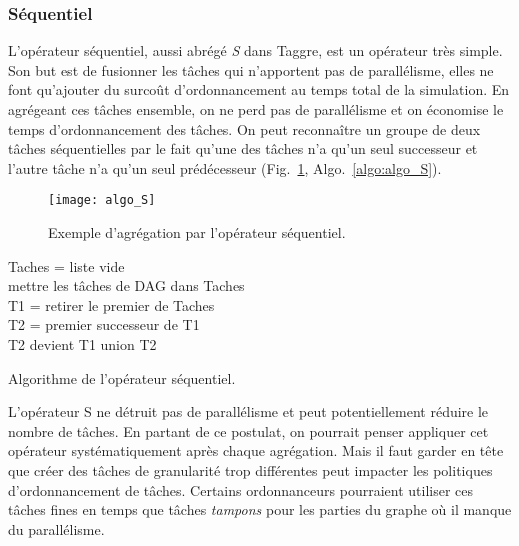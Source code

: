 \subsubsection{Séquentiel}
L'opérateur séquentiel, aussi abrégé {\em S} dans Taggre, est un opérateur très simple.
%
Son but est de fusionner les tâches qui n'apportent pas de parallélisme, elles ne font qu'ajouter du surcoût d'ordonnancement au temps total de la simulation.
%
En agrégeant ces tâches ensemble, on ne perd pas de parallélisme et on économise le temps d'ordonnancement des tâches.
%
On peut reconnaître un groupe de deux tâches séquentielles par le fait qu'une des tâches n'a qu'un seul successeur et l'autre tâche n'a qu'un seul prédécesseur (Fig.~\ref{fig:algo_S}, Algo.~\ref{algo:algo_S}).

\begin{figure}[!h]
  \centering
  \texttt{[image: algo\_S]}
  \caption{Exemple d'agrégation par l'opérateur séquentiel.}
  \label{fig:algo_S}
\end{figure}
\begin{algorithm}
  {\sc Taches} = liste vide \\
  mettre les tâches de DAG dans {\sc Taches} \\
   {
    {\sc T1} = retirer le premier de {\sc Taches} \\
     {
      {\sc T2} = premier successeur de {\sc T1} \\
       {
        {\sc T2} devient {\sc T1} union {\sc T2}\\
      }
    }
  }
  \caption{Algorithme de l'opérateur séquentiel.}
  \label{algo:algo_S}
\end{algorithm}
L'opérateur S ne détruit pas de parallélisme et peut potentiellement réduire le nombre de tâches.
%
En partant de ce postulat, on pourrait penser appliquer cet opérateur systématiquement après chaque agrégation.
%
Mais il faut garder en tête que créer des tâches de granularité trop différentes peut impacter les politiques d'ordonnancement de tâches.
%
Certains ordonnanceurs pourraient utiliser ces tâches fines en temps que tâches {\em tampons} pour les parties du graphe où il manque du parallélisme.
